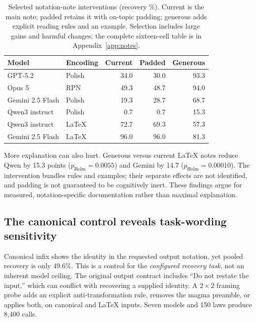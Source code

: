 \documentclass{article}
\newcommand{\pct}{\%}
\begin{document}
\begin{table}[t]
\centering
\small
\caption{Selected notation-note interventions (recovery \pct). Current is the
main note; padded retains it with on-topic padding; generous adds explicit
reading rules and an example. Selection includes large gains and harmful
changes; the complete sixteen-cell table is in Appendix~\ref{app:notes}.}
\label{tab:notes}
\begin{tabular}{llrrr}
\toprule
Model & Encoding & Current & Padded & Generous \\
\midrule
GPT-5.2 & Polish & 34.0 & 30.0 & 93.3 \\
Opus 5 & RPN & 49.3 & 48.7 & 94.0 \\
Gemini 2.5 Flash & Polish & 19.3 & 28.7 & 68.7 \\
Qwen3 instruct & Polish & 0.7 & 0.7 & 15.3 \\
Qwen3 instruct & LaTeX & 72.7 & 69.3 & 57.3 \\
Gemini 2.5 Flash & LaTeX & 96.0 & 96.0 & 81.3 \\
\bottomrule
\end{tabular}
\end{table}

More explanation can also hurt. Generous versus current LaTeX notes reduce
Qwen by 15.3 points ($p_{\mathrm{Holm}}=0.0055$) and Gemini by 14.7
($p_{\mathrm{Holm}}=0.00010$). The intervention bundles rules and examples;
their separate effects are not identified, and padding is not guaranteed to be
cognitively inert. These findings argue for measured, notation-specific
documentation rather than maximal explanation.

\subsection{The canonical control reveals task-wording sensitivity}

Canonical infix shows the identity in the requested output notation, yet pooled
recovery is only 49.6\pct{}. This is a control for the \emph{configured recovery
task}, not an inherent model ceiling. The original output contract includes
``Do not restate the input,'' which can conflict with recovering a supplied
identity. A $2\times2$ framing probe adds an explicit anti-transformation rule,
removes the magma preamble, or applies both, on canonical and LaTeX inputs.
Seven models and 150 laws produce 8,400 calls.
\end{document}
